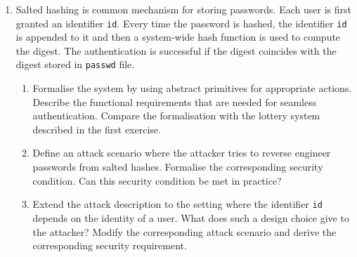 \documentclass{article}
\begin{document}
\begin{enumerate}
\item Salted hashing is common mechanism for storing passwords. Each
  user is first granted an identifier \texttt{id}. Every time the
  password is hashed, the identifier \texttt{id} is appended to it and
  then a system-wide hash function is used to compute the digest. The
  authentication is successful if the digest coincides with the digest
  stored in \texttt{passwd} file.
  \begin{enumerate}
  \item Formalise the system by using abstract primitives for
    appropriate actions. Describe the functional requirements that are
    needed for seamless authentication. Compare the formalisation with
    the lottery system described in the first exercise.
  \item Define an attack scenario where the attacker tries to reverse
    engineer passwords from salted hashes. Formalise the corresponding
    security condition. Can this security condition be met in
    practice?
  \item Extend the attack description to the setting where the
    identifier \texttt{id} depends on the identity of a user. What
    does such a design choice give to the attacker? Modify the
    corresponding attack scenario and derive the corresponding
    security requirement.
  \end{enumerate}



\end{enumerate}
\end{document}
